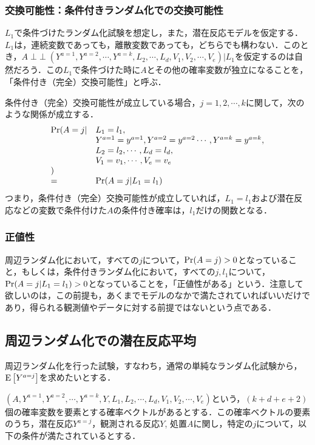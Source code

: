 \documentclass[12pt]{jsarticle}
\newcommand{\indep}{\mathop{\perp\!\!\!\perp}}
\begin{document}
\subsubsection{交換可能性：条件付きランダム化での交換可能性}
$L_1$で条件づけたランダム化試験を想定し，また，潜在反応モデルを仮定する．$L_1$は，連続変数であっても，離散変数であっても，どちらでも構わない．このとき，$A \indep (Y^{a=1}, Y^{a=2}, \cdots, Y^{a=k}, L_2, \cdots, L_d, V_1, V_2, \cdots, V_e) | L_1 $を仮定するのは自然だろう．この$L_1$で条件づけた時に$A$とその他の確率変数が独立になることを，「条件付き（完全）交換可能性」と呼ぶ．

条件付き（完全）交換可能性が成立している場合，$j = 1,2,\cdots, k$に関して，次のような関係が成立する．
\[
\begin{array}{ll}
{\rm Pr}(A=j | & L_1 = l_1, \\ 
& Y^{a=1}= y^{a=1}, Y^{a=2} = y^{a=2} \cdots, Y^{a=k}=y^{a=k}, \\
& L_2 = l_2, \cdots, L_d = l_d,  \\
& V_1 = v_1, \cdots, V_e = v_e\\
) & \\
=  & {\rm Pr}(A=j | L_1 = l_1)   \\
\end{array}
\]
つまり，条件付き（完全）交換可能性が成立していれば，$L_1=l_1$および潜在反応などの変数で条件付けた$A$の条件付き確率は，$l_1$だけの関数となる．


\subsubsection{正値性}
周辺ランダム化において，すべての$j$について，${\rm Pr}(A=j)>0$となっていること，もしくは，条件付きランダム化において，すべての$j, l_1$について，${\rm Pr}(A=j | L_1 = l_1)>0$となっていることを，「正値性がある」という．注意して欲しいのは，この前提も，あくまでモデルのなかで満たされていればいいだけであり，得られる観測値やデータに対する前提ではないという点である．



\subsection{周辺ランダム化での潜在反応平均}
周辺ランダム化を行った試験，すなわち，通常の単純なランダム化試験から，${\rm E}\left[Y^{a=j}\right]$を求めたいとする．


$(A, Y^{a=1}, Y^{a=2}, \cdots, Y^{a=k}, Y, L_1, L_2, \cdots, L_d, V_1, V_2, \cdots, V_e)$という，$(k+d+e+2)$個の確率変数を要素とする確率ベクトルがあるとする．この確率ベクトルの要素のうち，潜在反応$Y^{a=j}$，観測される反応$Y$, 処置$A$に関し，特定の$j$について，以下の条件が満たされているとする．
\end{document}
